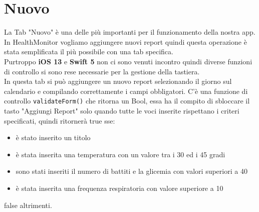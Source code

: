 \documentclass{article}
\begin{document}

\newpage
\section{Nuovo}

La Tab "Nuovo" è una delle più importanti per il funzionamento della nostra app. In HealthMonitor vogliamo aggiungere nuovi report quindi questa operazione è stata semplificata il più possibile con una tab specifica. \\
Purtroppo  \textbf{iOS 13} e \textbf{Swift 5} non ci sono venuti incontro quindi diverse funzioni di controllo si sono rese necessarie per la gestione della tastiera. \\
In questa tab si può aggiungere un nuovo report selezionando il giorno sul calendario e compilando correttamente i campi obbligatori. C'è una funzione di controllo \texttt{validateForm()} che ritorna un Bool, essa ha il compito di sbloccare il tasto "Aggiungi Report" solo quando tutte le voci inserite rispettano i criteri specificati, quindi ritornerà true sse: 
\begin{itemize}
  \item è stato inserito un titolo
  \item è stata inserita una temperatura con un valore tra i 30 ed i 45 gradi
  \item sono stati inseriti il numero di battiti e la glicemia con valori superiori a 40
  \item è stata inserita una frequenza respiratoria con valore superiore a 10 
\end{itemize}
false altrimenti.
\end{document}
